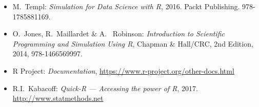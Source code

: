 \begin{itemize}[itemsep=0em]
  
\item{M.\ {\sc Templ}: {\em Simulation for Data Science with R},
    2016. Packt Publishing. 978-1785881169.}
  
\item{O.\ {\sc Jones}, R.\ {\sc Maillardet} \& A.\ {\sc
      Robinson}: {\em Introduction to Scientific Programming and
      Simulation Using R}, Chapman \& Hall/CRC, 2nd Edition, 2014,
    978-1466569997.}

\item{{\sc R Project}: {\em Documentation}, \url{https://www.r-project.org/other-docs.html}}
  
\item{R.I.\ {\sc Kabacoff}: {\em Quick-R --- Accessing the power of R}, 2017. \url{http://www.statmethods.net}}

\end{itemize}



\label{final} %


